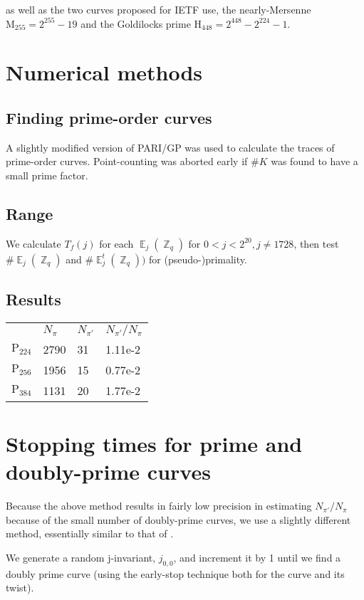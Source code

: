 \documentclass[11pt,fleqn]{article}
\newcommand{\Ej}{\ensuremath{\BbbE_j(\BbbZ_q)} }
\newcommand{\Ejt}{\ensuremath{\BbbE^t_j(\BbbZ_q))} }
\newcommand{\Tf}{\ensuremath{T_f(j)} }
\newcommand{\Pa}{\ensuremath{\mathup{P}_{224}} }
\newcommand{\Pb}{\ensuremath{\mathup{P}_{256}} }
\newcommand{\Pc}{\ensuremath{\mathup{P}_{384}} }
\newcommand{\Pd}{\ensuremath{\mathup{M}_{255}} }
\newcommand{\Pg}{\ensuremath{\mathup{H}_{448}} }
\begin{document}
as well as the two curves proposed for IETF use, the nearly-Mersenne $\Pd = 2^{255}-19$
and the Goldilocks prime $\Pg = 2^{448}-2^{224}-1$.

\section{Numerical methods}

\subsection{Finding prime-order curves}

A slightly modified version of PARI/GP was used to calculate the
traces of prime-order curves. Point-counting was aborted early
if $\#K$ was found to have a small prime factor.

\subsection{Range} 

We calculate \Tf for each \Ej for $0 < j < 2^{20}, j \neq 1728$, then
test $\#\Ej$ and $\#\Ejt$ for (pseudo-)primality.

\subsection{Results} 


\begin{tabular}[l]{l|lll}
      & $N_{\pi}$ & $N_{\pi'}$ & $N_{\pi'} / N_{\pi}$ \\
  \Pa & 2790 & 31 & 1.11e-2 \\
  \Pb & 1956 & 15 & 0.77e-2 \\
  \Pc & 1131 & 20 & 1.77e-2 \\
\end{tabular}

\section{Stopping times for prime and doubly-prime curves}

Because the above method results in fairly low precision in estimating
$N_{\pi'} / N_{\pi}$ because of the small number of doubly-prime curves,
we use a slightly different method, essentially similar to that of \autocite{shpar2014elltwin}.

We generate a random j-invariant, $j_{0,0}$, and increment it by 1 until
we find a doubly prime curve (using the early-stop technique both for the
curve and its twist).
\end{document}
